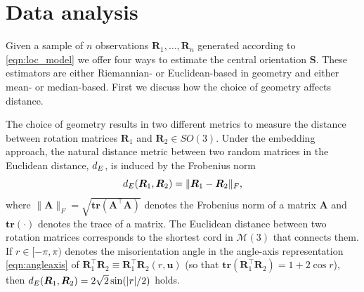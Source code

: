 %
%
%

\section{Data analysis\label{section:analysis}}

Given a sample of $n$ observations $\bm R_1,\dots,\bm R_{n}$ generated according to \eqref{eqn:loc_model} we offer four ways to estimate the central orientation $\bm S$.  These estimators are either Riemannian- or Euclidean-based in geometry and either mean- or median-based.  First we discuss how the choice of geometry affects distance.

The choice of geometry results in two different metrics to measure the distance between rotation matrices $\bm{R}_1$ and $\bm{R}_2 \in SO(3)$. Under the embedding approach, the natural distance metric between two random matrices in the Euclidean distance, $d_E$, is induced by the Frobenius norm 
\begin{equation}
\label{d_E}
d_E(\bm{R}_1,\bm{R}_2)=\|\bm{R}_1-\bm{R}_2\|_F, 
\end{equation}
where $\|\bm{A}\|_F = \sqrt{\mathbf{tr}({\bm A^\top \bm A})}$ denotes the Frobenius norm of a matrix $\bm A$ and $\mathbf{tr}(\cdot)$ denotes the trace of a matrix.  The Euclidean distance between two rotation matrices corresponds to the shortest cord in $\mathcal{M}(3)$ that connects them.  If $r\in[-\pi,\pi)$ denotes the misorientation angle in the angle-axis representation \eqref{eqn:angleaxis} of $\bm{R}_1^\top \bm{R}_2 \equiv \bm{R}_1^\top \bm{R}_2(r,\bm{u})$ (so that $\mathbf{tr}(\bm{R}_1^\top \bm{R}_2) =1 +2 \cos r$), then $d_E(\bm{R}_1,\bm{R}_2) = 2\sqrt{2}\sin(|r|/2)$ holds.

